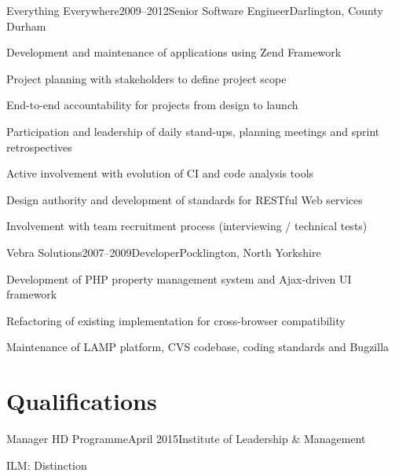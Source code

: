 \documentclass{cv}
\begin{document}

\begin{experience}{Everything Everywhere}{2009--2012}{Senior Software Engineer}{Darlington, County Durham}
\item Development and maintenance of applications using Zend Framework
\item Project planning with stakeholders to define project scope
\item End-to-end accountability for projects from design to launch
\item Participation and leadership of daily stand-ups, planning meetings and sprint retrospectives
\item Active involvement with evolution of CI and code analysis tools
\item Design authority and development of standards for RESTful Web services
\item Involvement with team recruitment process (interviewing / technical tests)
\end{experience}


\begin{experience}{Vebra Solutions}{2007--2009}{Developer}{Pocklington, North Yorkshire}
\item Development of PHP property management system and Ajax-driven UI framework
\item Refactoring of existing implementation for cross-browser compatibility
\item Maintenance of LAMP platform, CVS codebase, coding standards and Bugzilla
\end{experience}


\section{Qualifications}

\begin{experience}{Manager HD Programme}{April 2015}{Institute of Leadership \& Management}{}
\item ILM: Distinction
\end{experience}
\end{document}
